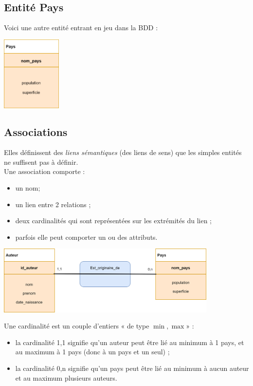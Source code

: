 \subsection{Entité Pays}
Voici une autre entité entrant en jeu dans la BDD :
\begin{center}
    \includegraphics[width=3cm]{img/pays}
\end{center}


\subsection{Associations}
Elles définissent des \textit{liens sémantiques} (des liens de sens)	 que les simples entités ne suffisent pas à définir.\\

Une association comporte :
\begin{itemize}
    \item	un nom;
    \item 	un lien entre 2 relations ;
    \item	deux cardinalités qui sont représentées sur les extrémités du lien ;
    \item 	parfois elle peut comporter un ou des attributs.
\end{itemize}

\begin{exemple}[]
    \begin{center}
        \includegraphics[width=11cm]{img/schema_1}
    \end{center}
    Une cardinalité est un couple d'entiers « de type $\min, \max$» :
    \begin{itemize}
        \item	la cardinalité 1,1 signifie qu'un auteur peut être lié au minimum à 1 pays, et au maximum à 1 pays (donc à un pays et un seul) ;
        \item	la cardinalité 0,n signifie qu'un pays peut être lié au minimum à aucun auteur et au maximum plusieurs auteurs.
    \end{itemize}
\end{exemple}


